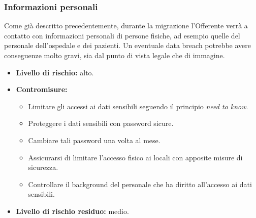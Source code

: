 				\subsubsection{Informazioni personali}
                	Come già descritto precedentemente, durante la migrazione l'Offerente verrà a contatto con informazioni personali di persone fisiche, ad esempio quelle del personale dell'ospedale e dei pazienti. Un eventuale data breach potrebbe avere conseguenze molto gravi, sia dal punto di vista legale che di immagine.
                    \begin{itemize}
                    	\item \textbf{Livello di rischio:} alto.
                        \item \textbf{Contromisure:} 
                        \begin{itemize}
                        	\item Limitare gli accessi ai dati sensibili seguendo il principio \textit{need to know}.
                            \item Proteggere i dati sensibili con password sicure.
                            \item Cambiare tali password una volta al mese.
                            \item Assicurarsi di limitare l'accesso fisico ai locali con apposite misure di sicurezza.
                            \item Controllare il background del personale che ha diritto all'accesso ai dati sensibili.
                        \end{itemize}
                        \item \textbf{Livello di rischio residuo:} medio.
                    \end{itemize}
                    

